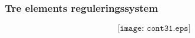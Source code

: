 \documentclass{beamer}
\begin{document}
%
%
%
%
%
%
%
\begin{frame}
	\frametitle{Tre elements reguleringssystem}

	
$$\texttt{[image: cont31.eps]}$$

\end{frame}
\end{document}
